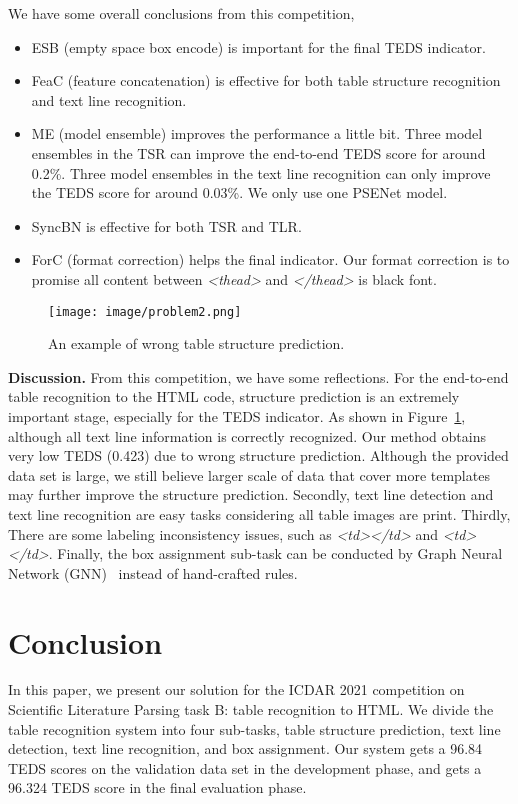 \documentclass{article}
\begin{document}
We have some overall conclusions from this competition,
\begin{itemize}[leftmargin=.1in]
\item ESB (empty space box encode) is important for the final TEDS indicator.
\item FeaC (feature concatenation) is effective for both table structure recognition and text line recognition.
\item ME (model ensemble) improves the performance a little bit. Three model ensembles in the TSR can improve the end-to-end TEDS score for around 0.2\%. Three model ensembles in the text line recognition can only improve the TEDS score for around 0.03\%. We only use one PSENet model.
\item SyncBN is effective for both TSR and TLR.
\item ForC (format correction) helps the final indicator. Our format correction is to promise all content between \emph{<thead>} and \emph{</thead>} is black font.
\end{itemize}



\begin{figure}[h] \centering
    \texttt{[image: image/problem2.png]}
    \caption{An example of wrong table structure prediction.}
    \label{fig:wrongexample}
\end{figure}


{\bf{Discussion.}} From this competition, we have some reflections. For the end-to-end table recognition to the HTML code, structure prediction is an extremely important stage, especially for the TEDS indicator. As shown in Figure~\ref{fig:wrongexample}, although all text line information is correctly recognized. Our method obtains very low TEDS (0.423) due to wrong structure prediction.
Although the provided data set is large, we still believe larger scale of data that cover more templates may further improve the structure prediction.
Secondly, text line detection and text line recognition are easy tasks considering all table images are print. Thirdly, There are some labeling inconsistency issues, such as 
\emph{<td></td>} and \emph{<td> </td>}. Finally, 
the box assignment sub-task can be conducted by Graph Neural Network (GNN)~\cite{chen2020learning} instead of hand-crafted rules.



\section{Conclusion}
\label{sec:conclusion}
In this paper, we present our solution for the ICDAR 2021 competition on Scientific Literature Parsing task B: table recognition to HTML. We divide the table recognition system into four sub-tasks, table structure prediction, text line detection, text line recognition, and box assignment. Our system gets a 96.84 TEDS scores on the validation data set in the development phase, and gets a 96.324 TEDS score in the final evaluation phase.

  

\end{document}
